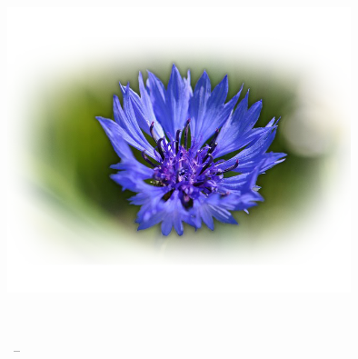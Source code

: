 
\begin{titlepage}

\begin{addmargin}[-1cm]{-3cm}
\begin{center}
\large

\hfill
\vfill

\begingroup
\color{MidnightBlue}\spacedallcaps{\myTitle} \\ \bigskip %
\endgroup

\spacedlowsmallcaps{\myName} %

\vfill

\includegraphics[width=10cm]{img/Estonian_Flower.png} \\ \medskip %

\mySubtitle \\ \medskip %

\myTime\ -- \myVersion %

\vfill

\end{center}
\end{addmargin}

\end{titlepage}
